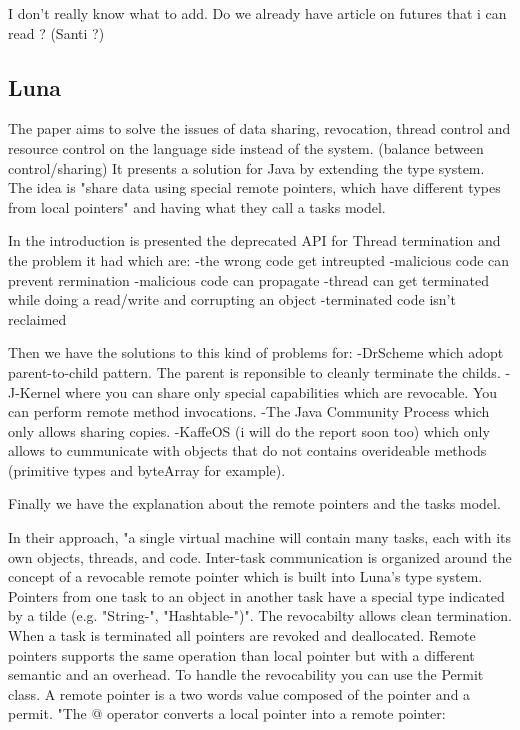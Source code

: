 \documentclass[11pt]{article} %
\begin{document}
I don't really know what to add. Do we already have article on futures that i can read ? (Santi ?)

\subsection{Luna}
The paper aims to solve the issues of data sharing, revocation, thread control and resource control on the language side instead of the system. (balance between control/sharing)
It presents a solution for Java by extending the type system. The idea is "share data using special remote pointers, which have different types from local pointers" and having what they call a tasks model.

In the introduction is presented the deprecated API for Thread termination and the problem it had which are:
-the wrong code get intreupted
-malicious code can prevent rermination
-malicious code can propagate
-thread can get terminated while doing a read/write and corrupting an object
-terminated code isn't reclaimed

Then we have the solutions to this kind of problems for:
-DrScheme which adopt parent-to-child pattern. The parent is reponsible to cleanly terminate the childs.
-J-Kernel where you can share only special capabilities which are revocable. You can perform remote method invocations.
-The Java Community Process which only allows sharing copies.
-KaffeOS (i will do the report soon too) which only allows to cummunicate with objects that do not contains overideable methods (primitive types and byteArray for example).

Finally we have the explanation about the remote pointers and the tasks model.

In their approach, "a single virtual machine will contain many tasks, each with its own objects, threads, and code.
Inter-task communication is organized around the concept of a revocable remote pointer which is built into Luna's type system. Pointers from one task to an object in another task have a special type indicated by a tilde (e.g. "String-", "Hashtable-")".
The revocabilty allows clean termination. When a task is terminated all pointers are revoked  and deallocated.
Remote pointers supports the same operation than local pointer but with a different semantic and an overhead.
To handle the revocability you can use the Permit class. A remote pointer is a two words value composed of the pointer and a permit.
"The @ operator converts a local pointer into a remote pointer:
\end{document}
